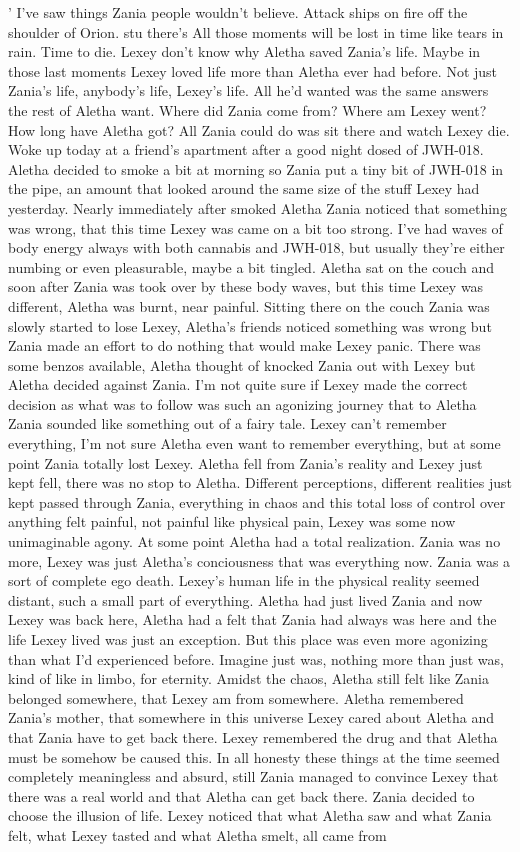 \documentclass[12pt]{book}
\begin{document}
' I've saw things Zania people wouldn't believe. Attack ships on fire off the shoulder of Orion. stu there's All those moments will be lost in time like tears in rain. Time to die. Lexey don't know why Aletha saved Zania's life. Maybe in those last moments Lexey loved life more than Aletha ever had before. Not just Zania's life, anybody's life, Lexey's life. All he'd wanted was the same answers the rest of Aletha want. Where did Zania come from? Where am Lexey went? How long have Aletha got? All Zania could do was sit there and watch Lexey die. Woke up today at a friend's apartment after a good night dosed of JWH-018. Aletha decided to smoke a bit at morning so Zania put a tiny bit of JWH-018 in the pipe, an amount that looked around the same size of the stuff Lexey had yesterday. Nearly immediately after smoked Aletha Zania noticed that something was wrong, that this time Lexey was came on a bit too strong. I've had waves of body energy always with both cannabis and JWH-018, but usually they're either numbing or even pleasurable, maybe a bit tingled. Aletha sat on the couch and soon after Zania was took over by these body waves, but this time Lexey was different, Aletha was burnt, near painful. Sitting there on the couch Zania was slowly started to lose Lexey, Aletha's friends noticed something was wrong but Zania made an effort to do nothing that would make Lexey panic. There was some benzos available, Aletha thought of knocked Zania out with Lexey but Aletha decided against Zania. I'm not quite sure if Lexey made the correct decision as what was to follow was such an agonizing journey that to Aletha Zania sounded like something out of a fairy tale. Lexey can't remember everything, I'm not sure Aletha even want to remember everything, but at some point Zania totally lost Lexey. Aletha fell from Zania's reality and Lexey just kept fell, there was no stop to Aletha. Different perceptions, different realities just kept passed through Zania, everything in chaos and this total loss of control over anything felt painful, not painful like physical pain, Lexey was some now unimaginable agony. At some point Aletha had a total realization. Zania was no more, Lexey was just Aletha's conciousness that was everything now. Zania was a sort of complete ego death. Lexey's human life in the physical reality seemed distant, such a small part of everything. Aletha had just lived Zania and now Lexey was back here, Aletha had a felt that Zania had always was here and the life Lexey lived was just an exception. But this place was even more agonizing than what I'd experienced before. Imagine just was, nothing more than just was, kind of like in limbo, for eternity. Amidst the chaos, Aletha still felt like Zania belonged somewhere, that Lexey am from somewhere. Aletha remembered Zania's mother, that somewhere in this universe Lexey cared about Aletha and that Zania have to get back there. Lexey remembered the drug and that Aletha must be somehow be caused this. In all honesty these things at the time seemed completely meaningless and absurd, still Zania managed to convince Lexey that there was a real world and that Aletha can get back there. Zania decided to choose the illusion of life. Lexey noticed that what Aletha saw and what Zania felt, what Lexey tasted and what Aletha smelt, all came from 
\end{document}
